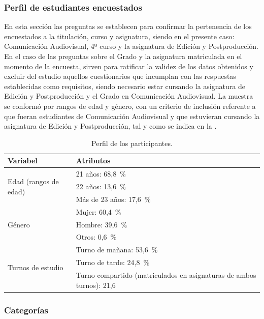\documentclass[spanish]{textolivre}
\begin{document}
\subsubsection{Perfil de estudiantes encuestados}\label{sec-organizacao}
En esta sección las preguntas se establecen para confirmar la pertenencia de los encuestados a la titulación, curso y asignatura, siendo en el presente caso: Comunicación Audiovisual, 4º curso y la asignatura de Edición y Postproducción. En el caso de las preguntas sobre el Grado y la asignatura matriculada en el momento de la encuesta, sirven para ratificar la validez de los datos obtenidos y excluir del estudio aquellos cuestionarios que incumplan con las respuestas establecidas como requisitos, siendo necesario estar cursando la asignatura de Edición y Postproducción y el Grado en Comunicación Audiovisual. La muestra se conformó por rangos de edad y género, con un criterio de inclusión referente a que fueran estudiantes de Comunicación Audiovisual y que estuvieran cursando la asignatura de Edición y Postproducción, tal y como se indica en la .

\begin{table}[h]
\centering\small
\begin{threeparttable}
\caption{Perfil de los participantes.}\label{tab-02}
\begin{tabular}{lp{10cm}}
\toprule
Variabel & Atributos\\
\midrule
\multirow[t]{3}{*}{Edad (rangos de edad)} & 21 años: 68,8~\% \\
  & 22 años: 13,6~\% \\
  & Más de 23 años: 17,6~\% \\[2ex]
\multirow[t]{3}{*}{Género} & Mujer: 60,4~\% \\
  & Hombre: 39,6~\% \\
  & Otros: 0,6~\% \\[2ex]
\multirow[t]{3}{*}{Turnos de estudio} & Turno de mañana: 53,6~\% \\
  & Turno de tarde: 24,8~\% \\
  & Turno compartido (matriculados en asignaturas de ambos turnos): 21,6\\
\bottomrule
\end{tabular}
\end{threeparttable}
\end{table}

\subsubsection{Categorías}\label{sec-organizacao-latex}
\end{document}
